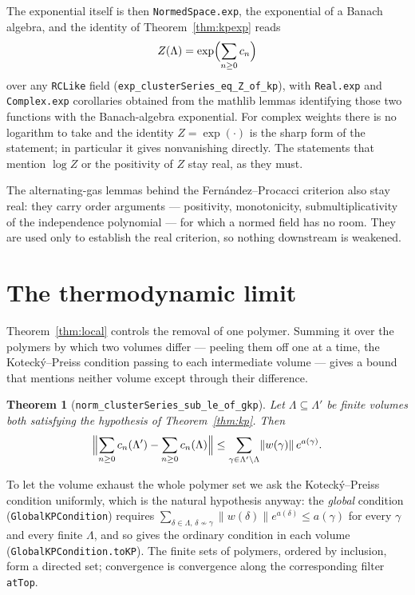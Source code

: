 \documentclass[11pt]{amsart}
\newtheorem{theorem}{Theorem}[section]
\begin{document}
The exponential itself is then \texttt{NormedSpace.exp}, the exponential
of a Banach algebra, and the identity of Theorem~\ref{thm:kpexp} reads
\[
  Z(\Lambda) = \exp\Bigl(\sum_{n \ge 0} c_n\Bigr)
\]
over any \texttt{RCLike} field
(\texttt{exp\_clusterSeries\_eq\_Z\_of\_kp}), with \texttt{Real.exp} and
\texttt{Complex.exp} corollaries obtained from the \textsf{mathlib}
lemmas identifying those two functions with the Banach-algebra
exponential. For complex weights there is
no logarithm to take and the identity $Z = \exp(\cdot)$ is the sharp
form of the statement; in particular it gives nonvanishing directly.
The statements that mention $\log Z$ or the positivity of $Z$ stay real,
as they must.

The alternating-gas lemmas behind the Fernández--Procacci criterion also
stay real: they carry order arguments --- positivity, monotonicity,
submultiplicativity of the independence polynomial --- for which a
normed field has no room. They are used only to establish the real
criterion, so nothing downstream is weakened.

\section{The thermodynamic limit}\label{sec:limit}

Theorem~\ref{thm:local} controls the removal of one polymer. Summing it
over the polymers by which two volumes differ --- peeling them off one at
a time, the Kotecký--Preiss condition passing to each intermediate
volume --- gives a bound that mentions neither volume except through
their difference.

\begin{theorem}[\texttt{norm\_clusterSeries\_sub\_le\_of\_gkp}]\label{thm:vol}
Let $\Lambda \subseteq \Lambda'$ be finite volumes both satisfying the
hypothesis of Theorem~\ref{thm:kp}. Then
\[
  \Bigl\lVert
    \sum_{n \ge 0} c_n(\Lambda') - \sum_{n \ge 0} c_n(\Lambda)
  \Bigr\rVert
  \le \sum_{\gamma \in \Lambda' \setminus \Lambda}
        \lVert w(\gamma) \rVert\, e^{a(\gamma)} .
\]
\end{theorem}

To let the volume exhaust the whole polymer set we ask the
Kotecký--Preiss condition uniformly, which is the natural hypothesis
anyway: the \emph{global} condition (\texttt{GlobalKPCondition}) requires
$\sum_{\delta \in \Lambda,\, \delta \not\sim \gamma}
\lVert w(\delta)\rVert e^{a(\delta)} \le a(\gamma)$ for every $\gamma$
and every finite $\Lambda$, and so gives the ordinary condition in each
volume (\texttt{GlobalKPCondition.toKP}). The finite sets of polymers,
ordered by inclusion, form a directed set; convergence is convergence
along the corresponding filter \texttt{atTop}.
\end{document}
